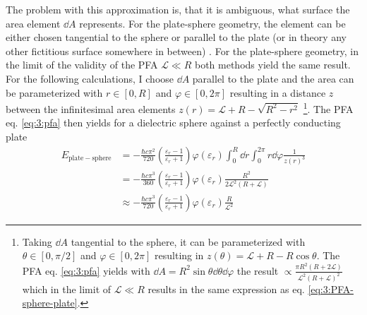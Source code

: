 The problem with this approximation is, that it is ambiguous, what surface the area element $\dd A$ represents. For the plate-sphere geometry, the element can be either chosen tangential to the sphere or parallel to the plate (or in theory any other fictitious surface somewhere in between) \cite{Bulgac_2006}.
For the plate-sphere geometry, in the limit of the validity of the PFA $\mathscr{L} \ll R$ both methods yield the same result.
For the following calculations, I choose $\dd A$ parallel to the plate and the area can be parameterized with $r\in [0, R]$ and $\varphi \in [0, 2\pi]$ resulting in a distance $z$ between the infinitesimal area elements $z(r) = \mathscr{L} + R - \sqrt{R^2 - r^2}$ \footnote{Taking $\dd A$ tangential to the sphere, it can be parameterized with $\theta \in [0, \pi/2]$ and $\varphi \in [0, 2\pi]$ resulting in $z(\theta) = \mathscr{L} + R - R\cos\theta$. The PFA eq. \eqref{eq:3:pfa} yields with $\dd A = R^2\sin\theta\dd\theta\dd\varphi$ the result $\propto \frac{\pi R^2(R + 2\mathscr{L})}{\mathscr{L}^2(R+\mathscr{L})^2}$ which in the limit of $\mathscr{L} \ll R$ results in the same expression as eq. \eqref{eq:3:PFA-sphere-plate}.}. The PFA eq. \eqref{eq:3:pfa} then yields for a dielectric sphere against a perfectly conducting plate
\begin{align}
  E_\mathrm{plate-sphere} &= -\frac{\hbar c \pi^2}{720} \left(\frac{\varepsilon_r - 1}{\varepsilon_r + 1}\right) \varphi(\varepsilon_r) \int_0^R \dd r \int_0^{2\pi} r\dd \varphi \frac{1}{z(r)^3} \\
  &= -\frac{\hbar c \pi^3}{360} \left(\frac{\varepsilon_r - 1}{\varepsilon_r + 1}\right) \varphi(\varepsilon_r) \frac{R^2}{2\mathscr{L}^2(R + \mathscr{L})} \\
  &\approx -\frac{\hbar c \pi^3}{720} \left(\frac{\varepsilon_r - 1}{\varepsilon_r + 1}\right) \varphi(\varepsilon_r) \frac{R}{\mathscr{L}^2} \label{eq:3:PFA-sphere-plate}
\end{align}
